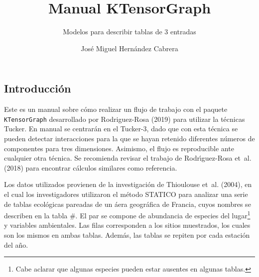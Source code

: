 \documentclass[
  spanish,
]{article}
\title{Manual KTensorGraph}
\subtitle{Modelos para describir tablas de 3 entradas}
\author{José Miguel Hernández Cabrera}
\date{}
\begin{document}
\maketitle

\hypertarget{introducciuxf3n}{%
\subsection{Introducción}\label{introducciuxf3n}}

Este es un manual sobre cómo realizar un flujo de trabajo con el paquete \texttt{KTensorGraph} desarrollado por Rodriguez-Rosa (2019) para utilizar la técnicas Tucker. En manual se centrarán en el Tucker-3, dado que con esta técnica se pueden detectar interacciones para la que se hayan retenido diferentes números de componentes para tres dimensiones. Asimismo, el flujo es reproducible ante cualquier otra técnica. Se recomienda revisar el trabajo de Rodrı́guez-Rosa et~al. (2018) para encontrar cálculos similares como referencia.

Los datos utilizados provienen de la investigación de Thioulouse et~al. (2004), en el cual los investigadores utilizaron el método STATICO para analizar una serie de tablas ecológicas pareadas de un áera geográfica de Francia, cuyos nombres se describen en la tabla \#. El par se compone de abundancia de especies del lugar\footnote{Cabe aclarar que algunas especies pueden estar ausentes en algunas tablas.} y variables ambientales. Las filas corresponden a los sitios muestrados, los cuales son los mismos en ambas tablas. Además, las tablas se repiten por cada estación del año.
\end{document}
